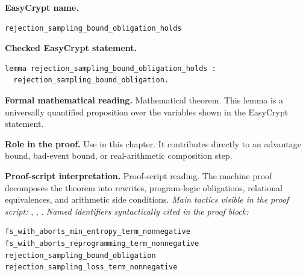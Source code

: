 \begin{formaltheorem}
\noindent\textbf{EasyCrypt name.}
\begin{lstlisting}[language=EasyCrypt,basicstyle=\ttfamily\scriptsize]
rejection_sampling_bound_obligation_holds
\end{lstlisting}
\noindent\textbf{Checked EasyCrypt statement.}
\begin{lstlisting}[language=EasyCrypt,basicstyle=\ttfamily\scriptsize]
lemma rejection_sampling_bound_obligation_holds :
  rejection_sampling_bound_obligation.
\end{lstlisting}
\noindent\textbf{Formal mathematical reading.}
Mathematical theorem. This lemma is a universally quantified proposition over the variables shown in the EasyCrypt statement.

\noindent\textbf{Role in the proof.}
Use in this chapter. It contributes directly to an advantage bound, bad-event bound, or real-arithmetic composition step.

\noindent\textbf{Proof-script interpretation.}
Proof-script reading. The machine proof decomposes the theorem into rewrites, program-logic obligations, relational equivalences, and arithmetic side conditions.
\emph{Main tactics visible in the proof script:} , , .
\emph{Named identifiers syntactically cited in the proof block:}
\begin{lstlisting}[language=EasyCrypt,basicstyle=\ttfamily\scriptsize]
fs_with_aborts_min_entropy_term_nonnegative
fs_with_aborts_reprogramming_term_nonnegative
rejection_sampling_bound_obligation
rejection_sampling_loss_term_nonnegative
\end{lstlisting}

\end{formaltheorem}

